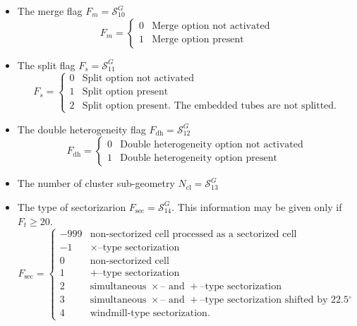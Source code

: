 \begin{itemize}
\item The merge flag $F_{m}=\mathcal{S}^{G}_{10}$ 
\begin{displaymath}
F_{m} = \left\{
\begin{array}{rl}
 0 & \textrm{Merge option not activated} \\
 1 & \textrm{Merge option present} 
\end{array} \right.
\end{displaymath}

\item The split flag $F_{s}=\mathcal{S}^{G}_{11}$ 
\begin{displaymath}
F_{s} = \left\{
\begin{array}{rl}
 0 & \textrm{Split option not activated} \\
 1 & \textrm{Split option present} \\
 2 & \textrm{Split option present. The embedded tubes are not splitted.} 
\end{array} \right.
\end{displaymath}

\item The double heterogeneity flag $F_{\mathrm{dh}}=\mathcal{S}^{G}_{12}$ 
\begin{displaymath}
F_{\mathrm{dh}} = \left\{
\begin{array}{rl}
 0 & \textrm{Double heterogeneity option not activated} \\
 1 & \textrm{Double heterogeneity option present} 
\end{array} \right.
\end{displaymath}

\item The number of cluster sub-geometry $N_{\mathrm{cl}}=\mathcal{S}^{G}_{13}$ 

\item The type of sectorizarion $F_{\mathrm{sec}}=\mathcal{S}^{G}_{14}$.
This information may be given only if $F_{t}\ge 20$.
\begin{displaymath}
F_{\mathrm{sec}} = \left\{
\begin{array}{rl}
-999 & \textrm{non-sectorized cell processed as a sectorized cell} \\
-1 & \textrm{$\times$--type sectorization} \\
 0 & \textrm{non-sectorized cell} \\
 1 & \textrm{$+$--type sectorization} \\
 2 & \textrm{simultaneous $\times$-- and $+$--type sectorization}  \\
 3 & \textrm{simultaneous $\times$-- and $+$--type sectorization shifted by 22.5$^\circ$} \\
 4 & \textrm{windmill-type sectorization.} 
\end{array} \right.
\end{displaymath}


\end{itemize}
